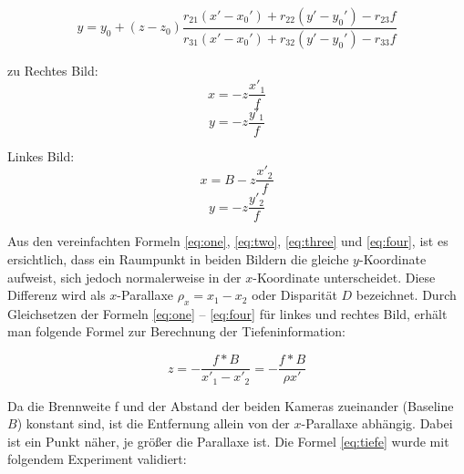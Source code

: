 \begin{equation}
y = y_{0} + (z - z_{0})\frac
{r_{21}(x'-x_{0}') + r_{22}(y'-y_{0}')-r_{23}f}
{r_{31}(x'-x_{0}') + r_{32}(y'-y_{0}')-r_{33}f}
\end{equation}

\noindent zu\newline
\noindent Rechtes Bild:
\begin{equation}\label{eq:one}
x = -z \frac{x'_{1}}{f}
\end{equation}
\begin{equation}\label{eq:two}
y = -z \frac{y'_{1}}{f}
\end{equation}

\noindent Linkes Bild:
\begin{equation}\label{eq:three}
x = B-z \frac{x'_{2}}{f}
\end{equation}
\begin{equation}\label{eq:four}
y = -z \frac{y'_{2}}{f}
\end{equation}

\noindent Aus den vereinfachten Formeln \ref{eq:one}, \ref{eq:two}, \ref{eq:three} und \ref{eq:four}, ist es ersichtlich, dass ein Raumpunkt in beiden Bildern die gleiche $y$-Koordinate aufweist, sich jedoch normalerweise in der $x$-Koordinate unterscheidet. Diese Differenz wird als $x$-Parallaxe 
$\rho_{x} = x_{1} - x_{2}$ oder Disparität $D$ bezeichnet.\newline
\noindent Durch Gleichsetzen der Formeln \ref{eq:one} – \ref{eq:four} für linkes und rechtes Bild, erhält man folgende Formel zur Berechnung der Tiefeninformation:

\begin{equation}\label{eq:tiefe}
z = -\frac
{f*B}
{x'_{1}-x'_{2}}
=
-\frac
{f*B}
{\rho x'}
\end{equation}

\noindent Da die Brennweite f und der Abstand der beiden Kameras zueinander (Baseline $B$) konstant sind, ist die Entfernung allein von der $x$-Parallaxe abhängig. Dabei ist ein Punkt näher, je größer die Parallaxe ist. \newline
Die Formel \ref{eq:tiefe} wurde mit folgendem Experiment validiert:


